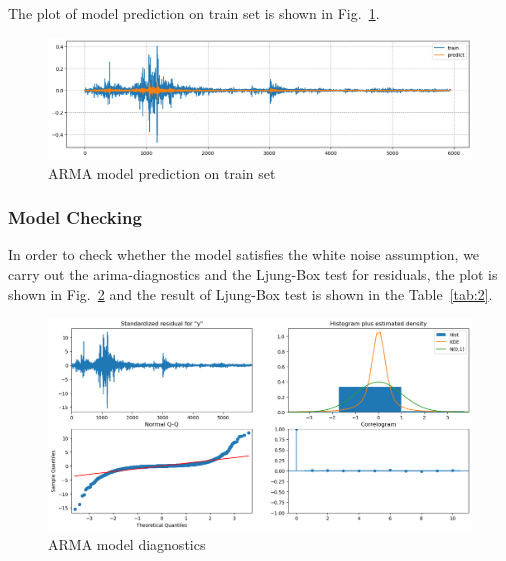 \documentclass[runningheads]{llncs}
\begin{document}
The plot of model prediction on train set is shown in Fig.~\ref{fig:6}.


\begin{figure}[htbp]
    \centering
    \includegraphics[width=\textwidth]{../img/arima_train_pred.png}
    \caption{ARMA model prediction on train set}
    \label{fig:6}
\end{figure}

\subsubsection{Model Checking}

In order to check whether the model satisfies the white noise assumption,
we carry out the arima-diagnostics and the Ljung-Box test for residuals,
the plot is shown in Fig.~\ref{fig:7} and the result of Ljung-Box test is shown in the Table~\ref{tab:2}.


\begin{figure}[htbp]
    \centering
    \includegraphics[width=\textwidth]{../img/arima_diagnostics.png}
    \caption{ARMA model diagnostics}
    \label{fig:7}
\end{figure}

\end{document}
